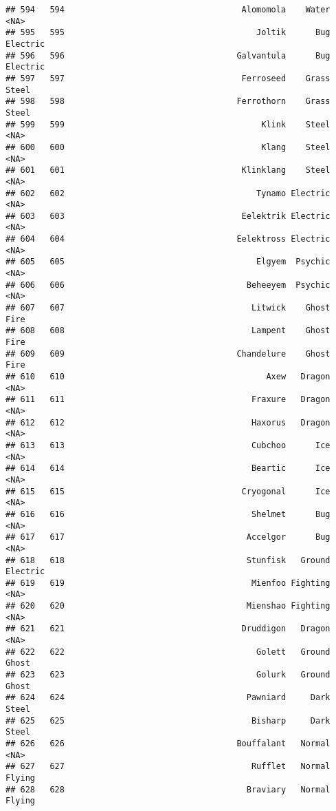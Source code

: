 \documentclass[
]{article}
\begin{document}
\begin{verbatim}
## 594   594                                    Alomomola    Water     <NA>
## 595   595                                       Joltik      Bug Electric
## 596   596                                   Galvantula      Bug Electric
## 597   597                                    Ferroseed    Grass    Steel
## 598   598                                   Ferrothorn    Grass    Steel
## 599   599                                        Klink    Steel     <NA>
## 600   600                                        Klang    Steel     <NA>
## 601   601                                    Klinklang    Steel     <NA>
## 602   602                                       Tynamo Electric     <NA>
## 603   603                                    Eelektrik Electric     <NA>
## 604   604                                   Eelektross Electric     <NA>
## 605   605                                       Elgyem  Psychic     <NA>
## 606   606                                     Beheeyem  Psychic     <NA>
## 607   607                                      Litwick    Ghost     Fire
## 608   608                                      Lampent    Ghost     Fire
## 609   609                                   Chandelure    Ghost     Fire
## 610   610                                         Axew   Dragon     <NA>
## 611   611                                      Fraxure   Dragon     <NA>
## 612   612                                      Haxorus   Dragon     <NA>
## 613   613                                      Cubchoo      Ice     <NA>
## 614   614                                      Beartic      Ice     <NA>
## 615   615                                    Cryogonal      Ice     <NA>
## 616   616                                      Shelmet      Bug     <NA>
## 617   617                                     Accelgor      Bug     <NA>
## 618   618                                     Stunfisk   Ground Electric
## 619   619                                      Mienfoo Fighting     <NA>
## 620   620                                     Mienshao Fighting     <NA>
## 621   621                                    Druddigon   Dragon     <NA>
## 622   622                                       Golett   Ground    Ghost
## 623   623                                       Golurk   Ground    Ghost
## 624   624                                     Pawniard     Dark    Steel
## 625   625                                      Bisharp     Dark    Steel
## 626   626                                   Bouffalant   Normal     <NA>
## 627   627                                      Rufflet   Normal   Flying
## 628   628                                     Braviary   Normal   Flying

\end{verbatim}
\end{document}
